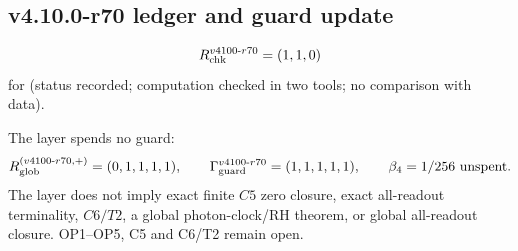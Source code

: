 \subsection*{v4.10.0-r70 ledger and guard update}
\label{subsec:v4100-r70-ledger-guard}

\[
R_{\rm chk}^{v4100\text{-}r70}=(1,1,0)
\]
for (status recorded; computation checked in two tools; no comparison with data).

The layer spends no guard:
\[
R_{\rm glob}^{(v4100\text{-}r70,+)}=(0,1,1,1,1),
\qquad
\Gamma_{\rm guard}^{v4100\text{-}r70}=(1,1,1,1,1),
\qquad
\beta_4=1/256\ \text{unspent}.
\]
The layer does not imply exact finite \(C5\) zero closure, exact all-readout terminality, \(C6/T2\), a global photon-clock/RH theorem,
or global all-readout closure.  OP1--OP5, C5 and C6/T2 remain open.
